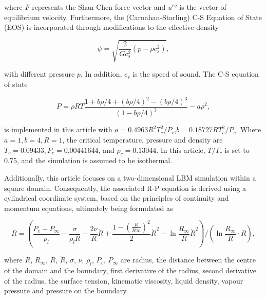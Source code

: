 \documentclass[review]{elsarticle}
\begin{document}
where $F$ represents the Shan-Chen force vector and $u^{eq}$ is the vector of equilibrium velocity. Furthermore, the (Carnahan-Starling) C-S Equation of State (EOS) is incorporated through modifications to the effective density \cite{shi2020numerical}
\begin{linenomath*}
\begin{equation}
	\psi=\sqrt{\frac{2}{G c_s^2}\left(p-\rho c_s^2\right)},
\end{equation}
\end{linenomath*}
with different pressure $p$. In addition, $c_s$ is the speed of sound. The C-S equation of state \cite{peng2019simulation}
\begin{linenomath*}
\begin{equation}
	P=\rho R T \frac{1+b \rho / 4+(b \rho / 4)^2-(b \rho / 4)^3}{(1-b \rho / 4)^3}-a \rho^2,
\end{equation}
\end{linenomath*}
is implemented in this article with $a= 0.4963R^2T_c^2/P_c$,$b=0.18727RT_c^2/P_c$. Where $ a= 1, b= 4, R= 1$, the
critical temperature, pressure and density are $T_c = 0.09433, P_c=0.00441644$, and $\rho_c= 0.13044$. In this article, $T/T_c$ is set to 0.75, and the simulation is assumed to be isothermal.

Additionally, this article focuses on a two-dimensional LBM simulation within a square domain. Consequently, the associated R-P equation is derived using a cylindrical coordinate system, based on the principles of continuity and momentum equations, ultimately being formulated as \cite{brennen2014cavitation}
\begin{linenomath*}
\begin{equation}
	\ddot{R}=\left(\frac{P_v-P_{\infty}}{\rho_l}-\frac{\sigma}{\rho_l R} -\frac{2 \nu}{R} \dot{R}+\frac{1-\left(\frac{R}{R \infty}\right)^2}{2} \dot{R}^2-\ln \frac{R_{\infty}}{R} \dot{R}^2\right)/\left(\ln \frac{R_{\infty}}{R} \cdot R\right),
\label{equ:r-p}
\end{equation}
\end{linenomath*}
where $R$, $R_{\infty}$, $\dot{R}$, $\ddot{R}$, $\sigma$, $\nu$, $\rho_l$, $P_v$, $P_{\infty}$ are radius, the distance between the centre of the domain and the boundary, first derivative of the radius, second derivative of the radius, the surface tension, kinematic viscosity, liquid density, vapour pressure and pressure on the boundary. 
\end{document}
